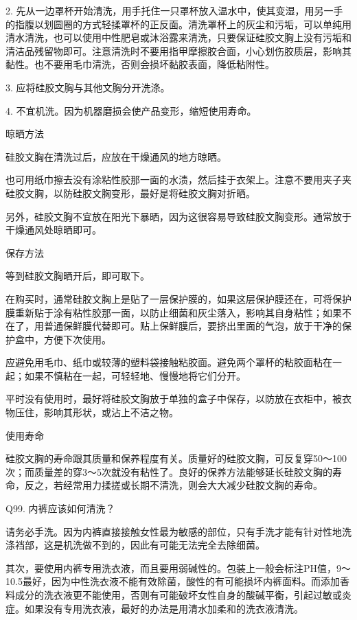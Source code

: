\documentclass[12pt,UTF8]{ctexbook}
\begin{document}
2. 先从一边罩杯开始清洗，用手托住一只罩杯放入温水中，使其变湿，用另一手的指腹以划圆圈的方式轻揉罩杯的正反面。清洗罩杯上的灰尘和污垢，可以单纯用清水清洗，也可以使用中性肥皂或沐浴露来清洗，只要保证硅胶文胸上没有污垢和清洁品残留物即可。注意清洗时不要用指甲摩擦胶合面，小心划伤胶质层，影响其黏性。也不要用毛巾清洗，否则会损坏黏胶表面，降低粘附性。

3. 应将硅胶文胸与其他文胸分开洗涤。

4. 不宜机洗。因为机器磨损会使产品变形，缩短使用寿命。

晾晒方法

硅胶文胸在清洗过后，应放在干燥通风的地方晾晒。

也可用纸巾擦去没有涂粘性胶那一面的水渍，然后挂于衣架上。注意不要用夹子夹硅胶文胸，以防硅胶文胸变形，最好是将硅胶文胸对折晒。

另外，硅胶文胸不宜放在阳光下暴晒，因为这很容易导致硅胶文胸变形。通常放于干燥通风处晾晒即可。

保存方法

等到硅胶文胸晒开后，即可取下。

在购买时，通常硅胶文胸上是贴了一层保护膜的，如果这层保护膜还在，可将保护膜重新贴于涂有粘性胶那一面，以防止细菌和灰尘落入，影响其自身粘性；如果不在了，用普通保鲜膜代替即可。贴上保鲜膜后，要挤出里面的气泡，放于干净的保护盒中，方便下次使用。

应避免用毛巾、纸巾或较薄的塑料袋接触粘胶面。避免两个罩杯的粘胶面粘在一起；如果不慎粘在一起，可轻轻地、慢慢地将它们分开。

平时没有使用时，最好将硅胶文胸放于单独的盒子中保存，以防放在衣柜中，被衣物压住，影响其形状，或沾上不洁之物。

使用寿命

硅胶文胸的寿命跟其质量和保养程度有关。质量好的硅胶文胸，可反复穿50～100次；而质量差的穿3～5次就没有粘性了。良好的保养方法能够延长硅胶文胸的寿命，反之，若经常用力揉搓或长期不清洗，则会大大减少硅胶文胸的寿命。





Q99. 内裤应该如何清洗？


请务必手洗。因为内裤直接接触女性最为敏感的部位，只有手洗才能有针对性地洗涤裆部，这是机洗做不到的，因此有可能无法完全去除细菌。

其次，要使用内裤专用洗衣液，而且要用弱碱性的。包装上一般会标注PH值，9～10.5最好，因为中性洗衣液不能有效除菌，酸性的有可能损坏内裤面料。而添加香料成分的洗衣液更不能使用，否则有可能破坏女性自身的酸碱平衡，引起过敏或炎症。如果没有专用洗衣液，最好的办法是用清水加柔和的洗衣液清洗。
\end{document}
